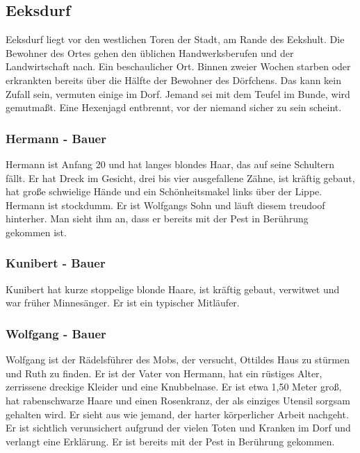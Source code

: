 \subsection{Eeksdurf}

Eeksdurf liegt vor den westlichen Toren der Stadt, am Rande des Eekshult. Die Bewohner des Ortes gehen den üblichen Handwerksberufen und der Landwirtschaft nach. Ein beschaulicher Ort. Binnen zweier Wochen starben oder erkrankten bereits über die Hälfte der Bewohner des Dörfchens. Das kann kein Zufall sein, vermuten einige im Dorf. Jemand sei mit dem Teufel im Bunde, wird gemutmaßt. Eine Hexenjagd entbrennt, vor der niemand sicher zu sein scheint.

\subsubsection*{Hermann - Bauer}
\label{Hermann}

Hermann ist Anfang 20 und hat langes blondes Haar, das auf seine Schultern fällt. Er hat Dreck im Gesicht, drei bis vier ausgefallene Zähne, ist kräftig gebaut, hat große schwielige Hände und ein Schönheitsmakel links über der Lippe. Hermann ist stockdumm. Er ist Wolfgangs Sohn und läuft diesem treudoof hinterher. Man sieht ihm an, dass er bereits mit der Pest in Berührung gekommen ist.

\subsubsection*{Kunibert - Bauer}
\label{Kunibert}

Kunibert hat kurze stoppelige blonde Haare, ist kräftig gebaut, verwitwet und war früher Minnesänger. Er ist ein typischer Mitläufer.

\subsubsection*{Wolfgang - Bauer}
\label{Wolfgang}

Wolfgang ist der Rädelsführer des Mobs, der versucht, Ottildes Haus zu stürmen und Ruth zu finden. Er ist der Vater von Hermann, hat ein rüstiges Alter, zerrissene dreckige Kleider und eine Knubbelnase. Er ist etwa 1,50 Meter groß, hat rabenschwarze Haare und einen Rosenkranz, der als einziges Utensil sorgsam gehalten wird. Er sieht aus wie jemand, der harter körperlicher Arbeit nachgeht. Er ist sichtlich verunsichert aufgrund der vielen Toten und Kranken im Dorf und verlangt eine Erklärung. Er ist bereits mit der Pest in Berührung gekommen.

